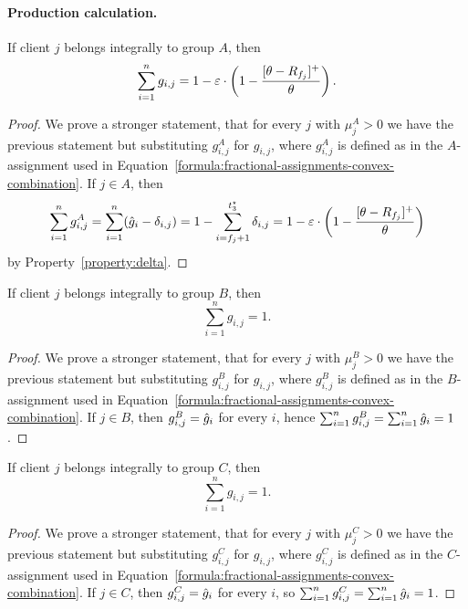 \paragraph{Production calculation.}


\begin{lemma}
    \label{lem:gen-A}
    If client $j$ belongs integrally to group $A$, then
    \begin{equation*}
        \sum_{i=1}^n g_{i,j} = 1 - \varepsilon \cdot \left(1 - \frac{[\theta - R_{f_j}]^+}{\theta}\right).
    \end{equation*}
\end{lemma}
\begin{proof}
    We prove a stronger statement, that for every $j$ with $\mu_j^A > 0$ we have the previous statement but substituting $g_{i,j}^A$ for $g_{i,j}$, where $g_{i,j}^A$ is defined as in the $A$-assignment used in Equation~\ref{formula:fractional-assignments-convex-combination}. 
    If $j \in A$, then
    \begin{equation*}
        \sum_{i=1}^n g_{i,j}^A = \sum_{i=1}^n (\hat{g}_i-\delta_{i,j}) = 1 - \sum_{i=f_j+1}^{t_3^\star} \delta_{i,j}
        = 1 - \varepsilon \cdot \left(1 - \frac{[\theta - R_{f_j}]^+}{\theta}\right)
    \end{equation*}
    by Property~\ref{property:delta}.
\end{proof}

\begin{lemma}
    \label{lem:gen-B}
    If client $j$ belongs integrally to group $B$, then
    \begin{equation*}
        \sum_{i=1}^n g_{i,j} = 1.
    \end{equation*}
\end{lemma}
\begin{proof}
    We prove a stronger statement, that for every $j$ with $\mu_j^B > 0$ we have the previous statement but substituting $g_{i,j}^B$ for $g_{i,j}$, where $g_{i,j}^B$ is defined as in the $B$-assignment used in Equation~\ref{formula:fractional-assignments-convex-combination}.
    If $j \in B$, then $g_{i,j}^B=\hat{g}_i$ for every $i$, hence $\sum_{i=1}^n g_{i,j}^B=\sum_{i=1}^n \hat{g}_i=1$.
\end{proof}

\begin{lemma}
    \label{lem:gen-C}
    If client $j$ belongs integrally to group $C$, then
    \begin{equation*}
        \sum_{i=1}^n g_{i,j} = 1.
    \end{equation*}
\end{lemma}
\begin{proof}
    We prove a stronger statement, that for every $j$ with $\mu_j^C > 0$ we have the previous statement but substituting $g_{i,j}^C$ for $g_{i,j}$, where $g_{i,j}^C$ is defined as in the $C$-assignment used in Equation~\ref{formula:fractional-assignments-convex-combination}.
    If $j \in C$, then $g_{i,j}^C=\hat{g}_i$ for every $i$, so $\sum_{i=1}^n g_{i,j}^C=\sum_{i=1}^n \hat{g}_i=1$.
\end{proof}

